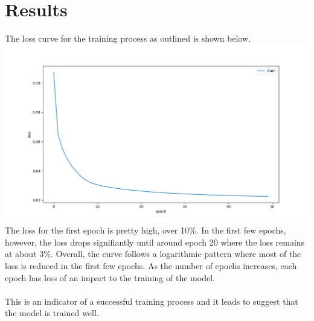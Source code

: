 \documentclass[letterpaper,11pt,twoside]{article}
\begin{document}
\section{Results}
The loss curve for the training process as outlined is shown below.\\
\includegraphics[scale=0.45]{src/loss.MLP.8.png}
\\
The loss for the first epoch is pretty high, over 10\%. In the first few epochs, however, the loss drops signifiantly until around epoch 20 where the loss remains at about 3\%. Overall, the curve follows a logarithmic pattern where most of the loss is reduced in the first few epochs. As the number of epochs increases, each epoch has less of an impact to the training of the model.
\\
\\
This is an indicator of a successful training process and it leads to suggest that the model is trained well.
\end{document}
